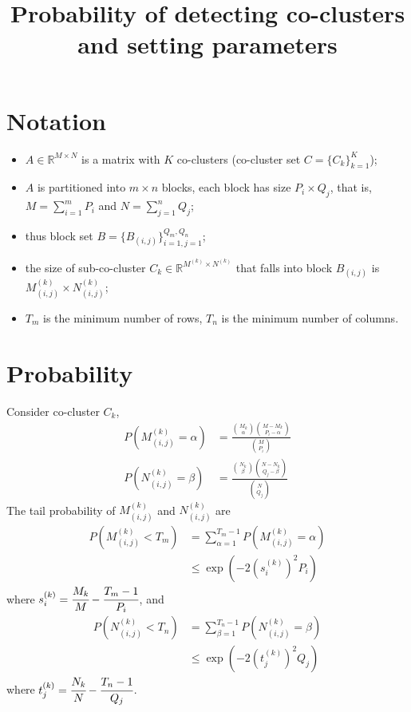 \documentclass[12pt]{article}
\title{Probability of detecting co-clusters and setting parameters}
\author{}
\date{}
\begin{document}
\maketitle
\section{Notation}
\begin{itemize}
    \item $A \in \mathbb{R}^{M \times N}$ is a matrix with $K$ co-clusters (co-cluster set $C = \{C_k\}_{k=1}^K$);
    \item $A$ is partitioned into $m \times n$ blocks, each block has size $P_i \times Q_j$, that is, $M=\sum_{i=1}^m P_i$ and $N=\sum_{j=1}^n Q_j$;
    \item thus block set $B = \{B_{(i,j)}\}_{i=1,j=1}^{Q_m,Q_n}$;
    \item the size of sub-co-cluster $C_k \in \mathbb{R}^{M^{(k)} \times N^{(k)}}$ that falls into block $B_{(i,j)}$ is $M_{(i,j)}^{(k)} \times N_{(i,j)}^{(k)}$;
    \item $T_m$ is the minimum number of rows, $T_n$ is the minimum number of columns.
\end{itemize}

\section{Probability}
Consider co-cluster $C_k$,
\begin{align*}
    P(M_{(i,j)}^{(k)} = \alpha) & = \frac{\binom{M_k}{\alpha} \binom{M-M_k}{P_i-\alpha}}{\binom{M}{P_i}} \\
    P(N_{(i,j)}^{(k)} = \beta)  & = \frac{\binom{N_k}{\beta} \binom{N-N_k}{Q_j-\beta}}{\binom{N}{Q_j}}
\end{align*}
The tail probability of $M_{(i,j)}^{(k)}$ and $N_{(i,j)}^{(k)}$ are
\begin{align*}
    P(M_{(i,j)}^{(k)} < T_m) & = \sum_{\alpha=1}^{T_m-1} P(M_{(i,j)}^{(k)} = \alpha) \\
                             & \le \exp(-2 (s_i^{(k)})^2 P_i)
\end{align*}
where $s_i^{(k)} = \cfrac{M_k}{M}-\cfrac{T_m-1}{P_i}$, and
\begin{align*}
    P(N_{(i,j)}^{(k)} < T_n) & = \sum_{\beta=1}^{T_n-1} P(N_{(i,j)}^{(k)} = \beta) \\
                             & \le \exp (-2 (t_j^{(k)})^2 Q_j)
\end{align*}
where $t_j^{(k)} = \cfrac{N_k}{N}-\cfrac{T_n-1}{Q_j}$.
\end{document}

